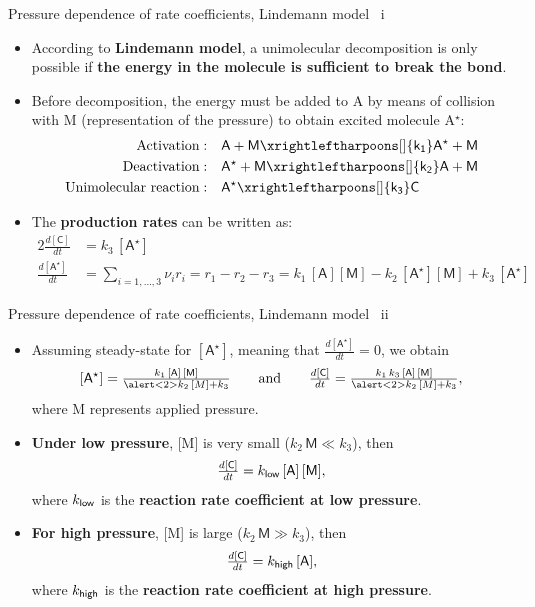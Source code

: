 %
\begin{frame}{Pressure dependence of rate coefficients, Lindemann model \, i}
	\begin{itemize}
		\item According to \alert{\bf Lindemann model}, a unimolecular decomposition is only possible if {\bf the energy in the molecule is 
		sufficient to break the bond}.
		\item Before decomposition, the energy must be added to A by means of collision with M (representation of the pressure) to obtain excited molecule A$^\star$:
		 \begin{alignat*}{2}
			\mbox{Activation} : & \quad \mathsf{A + M \xrightleftharpoons[]{k_1} A^\star + M} \\
			\mbox{Deactivation}: & \quad \mathsf{A^\star + M \xrightleftharpoons[]{k_2} A + M} \\
			\mbox{Unimolecular reaction}: & \quad \mathsf{A^\star \xrightleftharpoons[]{k_3} C}
		 \end{alignat*}
		\item The {\bf production rates} can be written as: 
		 \begin{alignat*}{2}
			\tfrac{d\mathsf{[C]}}{dt}          & = k_3 \, \mathsf{[A^\star]} \\
			\tfrac{d\mathsf{[A^\star]}}{dt} & 
			= \sum_{i = 1, \ldots, 3} \nu_i r_i 
			=  r_1 - r_2 - r_3 
			= k_1 \, \mathsf{[A][M]} - k_2 \, \mathsf{[A^\star][M]} + k_3 \, \mathsf{[A^\star]}
		\end{alignat*}
	\end{itemize}
\end{frame}
%
%
\begin{frame}{Pressure dependence of rate coefficients, Lindemann model \, ii}
	\begin{itemize}
		\item Assuming steady-state for $\mathsf{[A^\star]}$, meaning that $\tfrac{d[\mathsf{A^\star}]}{dt} = 0$, we obtain
		\[
		\mathsf{[A^\star]} = \tfrac{k_1 \, \mathsf{[A]\, [M]}}{\alert<2>{k_2 \, [M]} + k_3} \qquad \mbox{and}  \qquad
		\tfrac{d\mathsf{[C]}}{dt} = \tfrac{k_1 \, k_3 \, \mathsf{[A]\, [M]}}{\alert<2>{k_2 \, [M]}  + k_3}, 
		\]
		where M represents applied pressure.\\[5pt]
		\pause
		\pause
		\item {\bf Under low pressure}, [M] is very small ($k_2\, \mathsf{M} \ll k_3$), then 
		\[	
		\tfrac{d\mathsf{[C]}}{dt} = k_{\sf low} \, \mathsf{[A]\, [M]},
		\]
		where $k_{\sf low}$ is the {\bf reaction rate coefficient at low pressure}.\\[5pt]
		\pause
		\item {\bf For high pressure}, [M] is large  ($k_2\, \mathsf{M} \gg k_3$), then 
		\[	
		\tfrac{d\mathsf{[C]}}{dt} = k_{\sf high} \, \mathsf{[A]},
		\]
		where $k_{\sf high} $ is the {\bf reaction rate coefficient at high pressure}.
	\end{itemize}
\end{frame}
